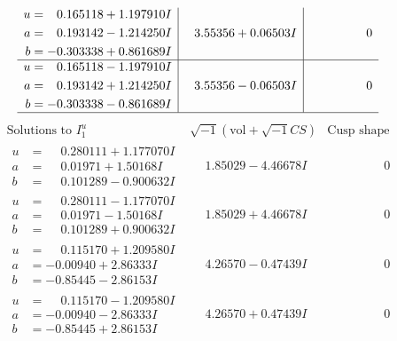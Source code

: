 \documentclass[1p]{elsarticle_modified}
\theoremstyle{definition}
\newcommand{\I}{\sqrt{-1}}
\begin{document}
$$\begin{array}{c|c|c}
\begin{aligned}
u &= \phantom{-}0.165118 + 1.197910 I \\
a &= \phantom{-}0.193142 - 1.214250 I \\
b &= -0.303338 + 0.861689 I\end{aligned}
 & \phantom{-}3.55356 + 0.06503 I & \phantom{-0.000000 } 0 \\ \hline\begin{aligned}
u &= \phantom{-}0.165118 - 1.197910 I \\
a &= \phantom{-}0.193142 + 1.214250 I \\
b &= -0.303338 - 0.861689 I\end{aligned}
 & \phantom{-}3.55356 - 0.06503 I & \phantom{-0.000000 } 0\\
 \hline 
 \end{array}$$\newpage$$\begin{array}{c|c|c}  
\text{Solutions to }I^u_{1}& \I (\text{vol} + \sqrt{-1}CS) & \text{Cusp shape}\\
 \hline 
\begin{aligned}
u &= \phantom{-}0.280111 + 1.177070 I \\
a &= \phantom{-}0.01971 + 1.50168 I \\
b &= \phantom{-}0.101289 - 0.900632 I\end{aligned}
 & \phantom{-}1.85029 - 4.46678 I & \phantom{-0.000000 } 0 \\ \hline\begin{aligned}
u &= \phantom{-}0.280111 - 1.177070 I \\
a &= \phantom{-}0.01971 - 1.50168 I \\
b &= \phantom{-}0.101289 + 0.900632 I\end{aligned}
 & \phantom{-}1.85029 + 4.46678 I & \phantom{-0.000000 } 0 \\ \hline\begin{aligned}
u &= \phantom{-}0.115170 + 1.209580 I \\
a &= -0.00940 + 2.86333 I \\
b &= -0.85445 - 2.86153 I\end{aligned}
 & \phantom{-}4.26570 - 0.47439 I & \phantom{-0.000000 } 0 \\ \hline\begin{aligned}
u &= \phantom{-}0.115170 - 1.209580 I \\
a &= -0.00940 - 2.86333 I \\
b &= -0.85445 + 2.86153 I\end{aligned}
 & \phantom{-}4.26570 + 0.47439 I & \phantom{-0.000000 } 0 \\ \hline\begin{aligned}

\end{aligned}
\end{array}$$
\end{document}
